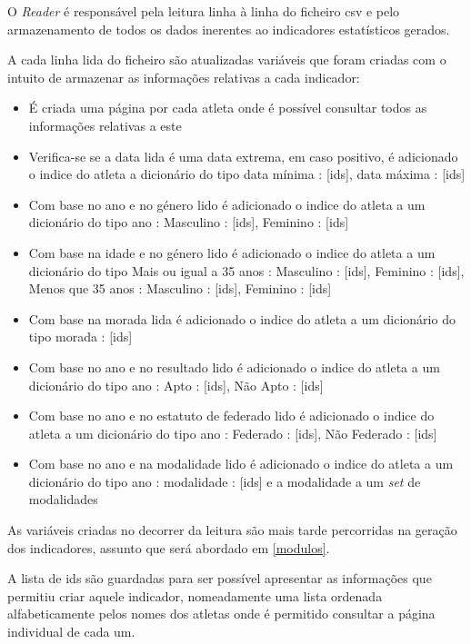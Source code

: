 O \textit{Reader} é responsável pela leitura linha à linha do ficheiro
csv e pelo armazenamento de todos os dados inerentes ao indicadores estatísticos
gerados.

A cada linha lida do ficheiro são atualizadas variáveis que foram criadas com o intuito de
armazenar as informações relativas a cada indicador:
\begin{itemize}
    \item É criada uma página por cada atleta onde é possível consultar todos as 
    informações relativas a este
    \item Verifica-se se a data lida é uma data extrema, em caso positivo, é adicionado
    o indice do atleta a dicionário do tipo {data mínima : [ids], data máxima : [ids]}
    \item Com base no ano e no género lido é adicionado o indice do atleta
    a um dicionário do tipo {ano : {Masculino : [ids], Feminino : [ids]}}
    \item Com base na idade e no género lido é adicionado o indice do atleta
    a um dicionário do tipo {Mais ou igual a 35 anos : {Masculino : [ids], 
    Feminino : [ids]}, Menos que 35 anos : {Masculino : [ids], 
    Feminino : [ids]}}
    \item Com base na morada lida é adicionado o indice do atleta
    a um dicionário do tipo {morada : [ids]}
    \item Com base no ano e no resultado lido é adicionado o indice do atleta
    a um dicionário do tipo {ano : {Apto : [ids], Não Apto : [ids]}}
    \item Com base no ano e no estatuto de federado lido é adicionado o indice do atleta
    a um dicionário do tipo {ano : {Federado : [ids], Não Federado : [ids]}}
    \item Com base no ano e na modalidade lido é adicionado o indice do atleta
    a um dicionário do tipo {ano : {modalidade : [ids]}} e a modalidade a um 
    \textit{set} de modalidades
\end{itemize}

As variáveis criadas no decorrer da leitura são mais tarde percorridas na geração dos
indicadores, assunto que será abordado em \ref{modulos}.

A lista de ids são guardadas para ser possível apresentar as informações que permitiu
criar aquele indicador, nomeadamente uma lista ordenada alfabeticamente pelos nomes dos 
atletas onde é permitido consultar a página individual de cada um.
